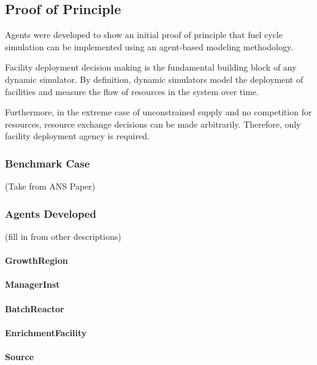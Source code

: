 \subsection{Proof of Principle}\label{abm:abm:proof}

Agents were developed to show an initial proof of principle that fuel cycle
simulation can be implemented using an agent-based modeling methodology.

Facility deployment decision making is the fundamental building block of any
dynamic simulator. By definition, dynamic simulators model the deployment of
facilities and measure the flow of resources in the system over time. 

Furthermore, in the extreme case of unconstrained supply and no competition for
resources, resource exchange decisions can be made arbitrarily. Therefore, only
facility deployment agency is required.

\subsubsection{Benchmark Case}

(Take from ANS Paper)

\subsubsection{Agents Developed}

(fill in from other descriptions)

\paragraph{GrowthRegion}

\paragraph{ManagerInst}

\paragraph{BatchReactor}

\paragraph{EnrichmentFacility}

\paragraph{Source}

